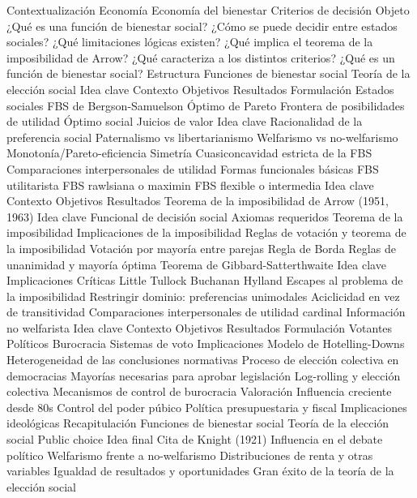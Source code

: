 \documentclass{nuevotema}
\begin{document}
\esquemacorto

\begin{esquema}[enumerate]
	\1[] 
		\2 Contextualización
			\3 Economía
			\3 Economía del bienestar
			\3 Criterios de decisión
		\2 Objeto
			\3 ¿Qué es una función de bienestar social?
			\3 ¿Cómo se puede decidir entre estados sociales?
			\3 ¿Qué limitaciones lógicas existen?
			\3 ¿Qué implica el teorema de la imposibilidad de Arrow?
			\3 ¿Qué caracteriza a los distintos criterios?
			\3 ¿Qué es un función de bienestar social?
		\2 Estructura
			\3 Funciones de bienestar social
			\3 Teoría de la elección social
	\1 
		\2 Idea clave
			\3 Contexto
			\3 Objetivos
			\3 Resultados
		\2 Formulación
			\3 Estados sociales
			\3 FBS de Bergson-Samuelson
			\3 Óptimo de Pareto
			\3 Frontera de posibilidades de utilidad
			\3 Óptimo social
		\2 Juicios de valor
			\3 Idea clave
			\3 Racionalidad de la preferencia social
			\3 Paternalismo vs libertarianismo
			\3 Welfarismo vs no-welfarismo
			\3 Monotonía/Pareto-eficiencia
			\3 Simetría
			\3 Cuasiconcavidad estricta de la FBS
			\3 Comparaciones interpersonales de utilidad
		\2 Formas funcionales básicas
			\3 FBS utilitarista
			\3 FBS rawlsiana o maximin
			\3 FBS flexible o intermedia
	\1 
		\2 Idea clave
			\3 Contexto
			\3 Objetivos
			\3 Resultados
		\2 Teorema de la imposibilidad de Arrow (1951, 1963)
			\3 Idea clave
			\3 Funcional de decisión social
			\3 Axiomas requeridos
			\3 Teorema de la imposibilidad
			\3 Implicaciones de la imposibilidad
		\2 Reglas de votación y teorema de la imposibilidad
			\3 Votación por mayoría entre parejas
			\3 Regla de Borda
			\3 Reglas de unanimidad y mayoría óptima
		\2 Teorema de Gibbard-Satterthwaite
			\3 Idea clave
			\3 Implicaciones
		\2 Críticas
			\3 Little
			\3 Tullock
			\3 Buchanan
			\3 Hylland
		\2 Escapes al problema de la imposibilidad
			\3 Restringir dominio: preferencias unimodales
			\3 Aciclicidad en vez de transitividad
			\3 Comparaciones interpersonales de utilidad cardinal
			\3 Información no welfarista
	\1 
		\2 Idea clave
			\3 Contexto
			\3 Objetivos
			\3 Resultados
		\2 Formulación
			\3 Votantes
			\3 Políticos
			\3 Burocracia
			\3 Sistemas de voto
		\2 Implicaciones
			\3 Modelo de Hotelling-Downs
			\3 Heterogeneidad de las conclusiones normativas
			\3 Proceso de elección colectiva en democracias
			\3 Mayorías necesarias para aprobar legislación
			\3 Log-rolling y elección colectiva
			\3 Mecanismos de control de burocracia
		\2 Valoración
			\3 Influencia creciente desde 80s
			\3 Control del poder púbico
			\3 Política presupuestaria y fiscal
			\3 Implicaciones ideológicas
	\1[] 
		\2 Recapitulación
			\3 Funciones de bienestar social
			\3 Teoría de la elección social
			\3 Public choice
		\2 Idea final
			\3 Cita de Knight (1921)
			\3 Influencia en el debate político
			\3 Welfarismo frente a no-welfarismo
			\3 Distribuciones de renta y otras variables
			\3 Igualdad de resultados y oportunidades
			\3 Gran éxito de la teoría de la elección social

\end{esquema}
\end{document}
